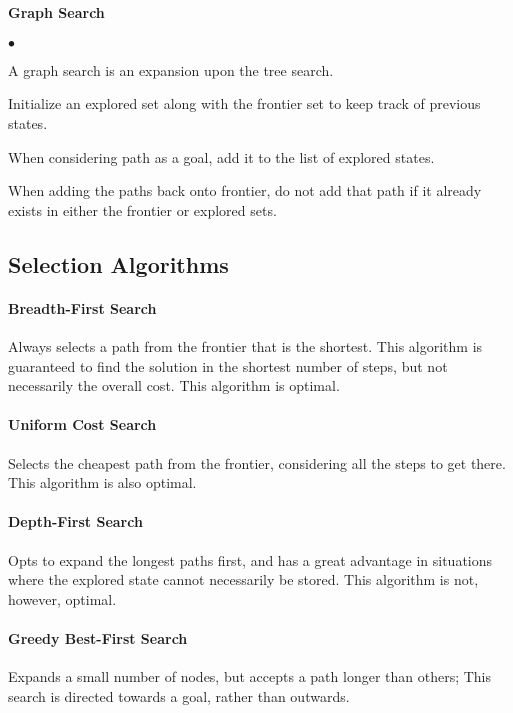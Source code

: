 \documentclass[11pt,letterpaper]{article}
\newcommand{\squishlist}{
 \begin{list}{$\bullet$}
  { \setlength{\itemsep}{0pt}
     \setlength{\parsep}{3pt}
     \setlength{\topsep}{3pt}
     \setlength{\partopsep}{0pt}
     \setlength{\leftmargin}{1.5em}
     \setlength{\labelwidth}{1em}
     \setlength{\labelsep}{0.5em} } }
\newcommand{\squishend}{
  \end{list}  }
\begin{document}
\paragraph{Graph Search}
\squishlist
\item A graph search is an expansion upon the tree search. \\[-.3cm]
\item Initialize an explored set along with the frontier set to keep track of previous states. \\[-.3cm]
\item When considering path as a goal, add it to the list of explored states. \\[-.3cm]
\item When adding the paths back onto frontier, do not add that path if it already exists in either the frontier or explored sets.
\squishend


\subsection{Selection Algorithms}
\paragraph{Breadth-First Search}
Always selects a path from the frontier that is the shortest. This algorithm is guaranteed to find the solution in the shortest number of steps, but not necessarily the overall cost. This algorithm is optimal.

\paragraph{Uniform Cost Search}
Selects the cheapest path from the frontier, considering all the steps to get there. This algorithm is also optimal.

\paragraph{Depth-First Search}
Opts to expand the longest paths first, and has a great advantage in situations where the explored state cannot necessarily be stored. This algorithm is not, however, optimal.

\paragraph{Greedy Best-First Search}
Expands a small number of nodes, but accepts a path longer than others; This search is directed towards a goal, rather than outwards.
\end{document}
